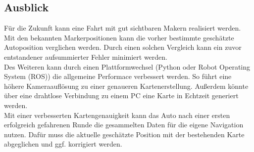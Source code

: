 \subsection{Ausblick}
Für die Zukunft kann eine Fahrt mit gut sichtbaren Makern realisiert werden. Mit den bekannten Markerpositionen kann die vorher bestimmte geschätzte Autoposition verglichen werden. Durch einen solchen Vergleich kann ein zuvor entstandener aufsummierter Fehler minimiert werden. \\
Des Weiteren kann durch einen Plattformwechsel (Python oder Robot Operating System (ROS)) die allgemeine Performace verbessert werden.  So führt eine höhere Kameraauflösung zu einer genaueren Kartenerstellung. Außerdem könnte über eine drahtlose Verbindung zu einem PC eine Karte in Echtzeit generiert werden.   \\
Mit einer verbesserten Kartengenauigkeit kann das Auto nach einer ersten erfolgreich gefahrenen Runde die gesammelten Daten für die eigene Navigation nutzen. Dafür muss die aktuelle geschätzte Position mit der bestehenden Karte abgeglichen und ggf. korrigiert werden.\\

